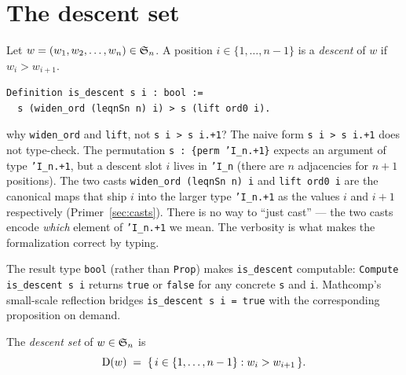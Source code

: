 \section{The descent set}
\label{sec:descent_set}

\begin{definition}[Descent]
  \label{def:is_descent}
  Let $w = (w_1, w_2, \dots, w_n) \in \mathfrak{S}_{n}$. A position
  $i \in \{1, \dots, n-1\}$ is a \emph{descent} of $w$ if
  $w_i > w_{i+1}$.
\end{definition}

\begin{lstlisting}[language=Rocq]
Definition is_descent s i : bool :=
  s (widen_ord (leqnSn n) i) > s (lift ord0 i).
\end{lstlisting}


\begin{sidebar}{why \texttt{widen\_ord} and \texttt{lift}, not \texttt{s i > s i.+1}?}
The naive form \texttt{s i > s i.+1} does not type-check. The
permutation \texttt{s : \{perm 'I\_n.+1\}} expects an argument of
type \texttt{'I\_n.+1}, but a descent slot $i$ lives in
\texttt{'I\_n} (there are $n$ adjacencies for $n+1$ positions).
The two casts \texttt{widen\_ord (leqnSn n) i} and
\texttt{lift ord0 i} are the canonical maps that ship $i$ into the
larger type \texttt{'I\_n.+1} as the values $i$ and $i+1$
respectively (Primer~\ref{sec:casts}). There is no way to ``just
cast'' --- the two casts encode \emph{which} element of
\texttt{'I\_n.+1} we mean. The verbosity is what makes the
formalization correct by typing.
\end{sidebar}

\noindent The result type \texttt{bool} (rather than \texttt{Prop})
makes \texttt{is\_descent} computable: \texttt{Compute is\_descent s i}
returns \texttt{true} or \texttt{false} for any concrete \texttt{s}
and \texttt{i}. Mathcomp's small-scale reflection bridges
\texttt{is\_descent\,s\,i\,=\,true} with the corresponding
proposition on demand.

\begin{definition}
  \label{def:descent_set}
  The \emph{descent set} of $w \in \mathfrak{S}_{n}$ is
  \[
    \mathrm{D}(w) \;=\; \{\, i \in \{1, \dots, n-1\} : w_i > w_{i+1} \,\}.
  \]
\end{definition}

